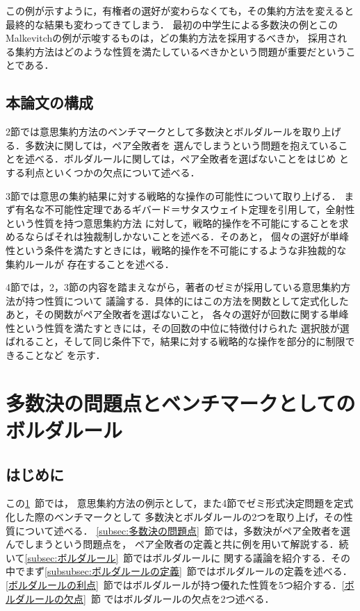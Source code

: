 \documentclass[dvipdfmx]{jsarticle}
\begin{document}
この例が示すように，有権者の選好が変わらなくても，その集約方法を変えると最終的な結果も変わってきてしまう．
最初の中学生による多数決の例とこのMalkevitchの例が示唆するものは，どの集約方法を採用するべきか，
採用される集約方法はどのような性質を満たしているべきかという問題が重要だということである．

\subsection{本論文の構成}
2節では意思集約方法のベンチマークとして多数決とボルダルールを取り上げる．多数決に関しては，ペア全敗者を
選んでしまうという問題を抱えていることを述べる．ボルダルールに関しては，ペア全敗者を選ばないことをはじめ
とする利点といくつかの欠点について述べる．

3節では意思の集約結果に対する戦略的な操作の可能性について取り上げる．
まず有名な不可能性定理であるギバード＝サタスウェイト定理を引用して，全射性という性質を持つ意思集約方法
に対して，戦略的操作を不可能にすることを求めるならばそれは独裁制しかないことを述べる．そのあと，
個々の選好が単峰性という条件を満たすときには，戦略的操作を不可能にするような非独裁的な集約ルールが
存在することを述べる．

4節では，2，3節の内容を踏まえながら，著者のゼミが採用している意思集約方法が持つ性質について
議論する．具体的にはこの方法を関数として定式化したあと，その関数がペア全敗者を選ばないこと，
各々の選好が回数に関する単峰性という性質を満たすときには，その回数の中位に特徴付けられた
選択肢が選ばれること，そして同じ条件下で，結果に対する戦略的な操作を部分的に制限できることなど
を示す．

\section{多数決の問題点とベンチマークとしてのボルダルール}\label{sec:多数決の問題点とベンチマークとしてのボルダルール}
\subsection{はじめに}
この\ref{sec:多数決の問題点とベンチマークとしてのボルダルール}~節では，
意思集約方法の例示として，また4節でゼミ形式決定問題を定式化した際のベンチマークとして
多数決とボルダルールの2つを取り上げ，その性質について述べる．
\ref{subsec:多数決の問題点}~節では，多数決がペア全敗者を選んでしまうという問題点を，
ペア全敗者の定義と共に例を用いて解説する．続いて\ref{subsec:ボルダルール}~節ではボルダルールに
関する議論を紹介する．その中でまず\ref{subsubsec:ボルダルールの定義}~節ではボルダルールの定義を述べる．
\ref{ボルダルールの利点}~節ではボルダルールが持つ優れた性質を5つ紹介する．\ref{ボルダルールの欠点}~節
ではボルダルールの欠点を2つ述べる．
\end{document}
